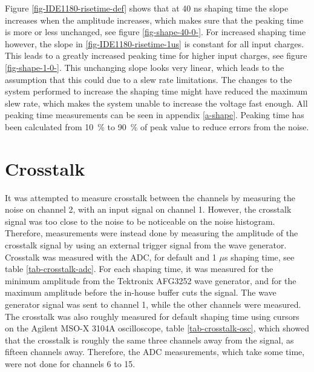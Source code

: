 \documentclass[../main/thesis.tex]{subfiles}
\begin{document}
Figure \ref{fig-IDE1180-risetime-def} shows that at 40 ns shaping time the slope increases when the amplitude increases, which makes sure that the peaking time is more or less unchanged, see figure \ref{fig-shape-40-0-}. For increased shaping time however, the slope in \ref{fig-IDE1180-risetime-1us} is constant for all input charges. This leads to a greatly increased peaking time for higher input charges, see figure \ref{fig-shape-1-0-}. This unchanging slope looks very linear, which leads to the assumption that this could due to a slew rate limitations. The changes to the system performed to increase the shaping time might have reduced the maximum slew rate, which makes the system unable to increase the voltage fast enough. All peaking time measurements can be seen in appendix \ref{a-shape}. Peaking time has been calculated from 10~\% to 90~\% of peak value to reduce errors from the noise.


\section{Crosstalk}
\label{ide-crosstalk}

It was attempted to measure crosstalk between the channels by measuring the noise on channel 2, with an input signal on channel 1. However, the crosstalk signal was too close to the noise to be noticeable on the noise histogram. Therefore, measurements were instead done by measuring the amplitude of the crosstalk signal by using an external trigger signal from the wave generator. Crosstalk was measured with the ADC, for default and 1 $\mu$s shaping time, see table \ref{tab-crosstalk-adc}. For each shaping time, it was measured for the minimum amplitude from the Tektronix AFG3252 wave generator, and for the maximum amplitude before the in-house buffer cuts the signal. The wave generator signal was sent to channel 1, while the other channels were measured. The crosstalk was also roughly measured for default shaping time using cursors on the Agilent MSO-X 3104A oscilloscope, table \ref{tab-crosstalk-osc}, which showed that the crosstalk is roughly the same three channels away from the signal, as fifteen channels away. Therefore, the ADC measurements, which take some time, were not done for channels 6 to 15. 
\end{document}
